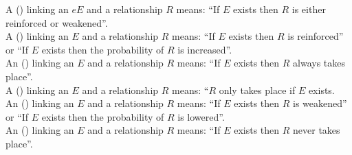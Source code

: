 A  () linking an  $eE$ and a relationship $R$ means: ``If $E$ exists then $R$ is either reinforced or weakened''. 
\\[\baselineskip]

\noindent
A  () linking an  $E$ and a relationship $R$ means: ``If $E$ exists then $R$ is reinforced'' or ``If $E$ exists then the probability of $R$ is increased''. 
\\[\baselineskip]

\noindent
An  () linking an  $E$ and a relationship $R$ means: ``If $E$ exists then $R$ always takes place''. 
\\[\baselineskip]

\noindent
A  () linking an  $E$ and a relationship $R$ means: ``$R$ only takes place if $E$ exists. 
\\[\baselineskip]

\noindent
An  () linking an  $E$ and a relationship $R$ means: ``If $E$ exists then $R$ is weakened'' or ``If $E$ exists then the probability of $R$ is lowered''. 
\\[\baselineskip]

\noindent
An  () linking an  $E$ and a relationship $R$ means: ``If $E$ exists then $R$ never takes place''. 
\\[\baselineskip]

